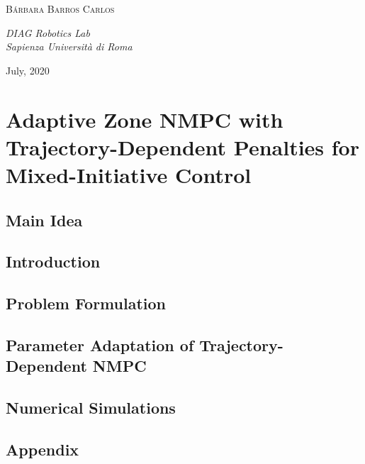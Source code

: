\documentclass{Base}
\begin{document}
\begin{center}
	\vspace{0.5\baselineskip} %
	
	{\scshape\Large B\'arbara Barros Carlos \\} %
	
	\vspace{0.5\baselineskip} %
	
	\textit{DIAG Robotics Lab \\ Sapienza Universit\`a di Roma} %
	
	\vfill %
	
	
	
	\vspace{0.3\baselineskip} 
	
	July, 2020 %
	
\end{center}

\chapter{Adaptive Zone NMPC with Trajectory-Dependent Penalties for Mixed-Initiative Control}

\section{Main Idea}

\section{Introduction}

\section{Problem Formulation}

\section{Parameter Adaptation of Trajectory-Dependent NMPC}

\section{Numerical Simulations}

\begin{appendix}
\chapter{Appendix}

\end{appendix}
\end{document}
